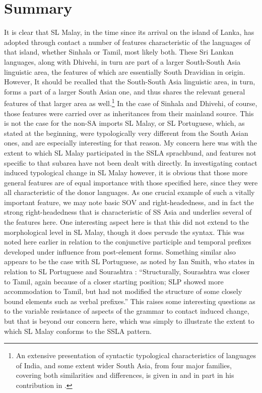 \section{Summary}
It is clear that SL Malay, in the time since its arrival on the island of Lanka, has adopted through contact a number of features characteristic of the languages of that island, whether Sinhala or Tamil, most likely both. These Sri Lankan languages, along with Dhivehi, in turn are part of a larger South-South Asia linguistic area, the features of which are essentially South Dravidian in origin. However, It should be recalled that the South-South Asia linguistic area, in turn, forms a part of a larger South Asian one, and thus shares the relevant general features of that larger area as well.\footnote{An
  extensive presentation of syntactic typological characteristics of languages of India, and some extent wider South Asia, from four major families, covering both similarities and differences, is given in \citet{Subbaraoinpress} and in part in his contribution in \citet{KachruEtAl2008}.
} 
In the case of Sinhala and Dhivehi, of course, those features were carried over as inheritances from their mainland source. This is not the case for the non-SA imports SL Malay, or SL Portuguese, which, as stated at the beginning, were typologically very different from the South Asian ones, and are especially interesting for that reason. My concern here was with the extent to which SL Malay participated in the SSLA sprachbund, and features not specific to that subarea have not been dealt with directly. In investigating contact induced typological change in SL Malay however, it is obvious that those more general features are of equal importance with those specified here, since they were all characteristic of the donor languages. 
 As one crucial example of such a vitally important feature, we may note basic SOV and right-headedness, and in fact the strong right-headedness that is characteristic of SS Asia and underlies several of the features here. One interesting aspect here is that this did not extend to the morphological level in SL Malay, though it does pervade the syntax. This was noted here earlier in relation to the conjunctive participle and temporal prefixes developed under influence from post-element forms. Something similar also appears to be the case with SL Portuguese, as noted by Ian Smith, who states in relation to SL Portuguese and Sourashtra \citep[408]{Smith2001}: ``Structurally, Sourashtra was closer to Tamil, again because of a closer starting position; SLP showed more accommodation to Tamil, but had not modified the structure of some closely bound elements such as verbal prefixes.'' This raises some interesting questions as to the variable resistance of aspects of the grammar to contact induced change, but that is beyond our concern here, which was simply to illustrate the extent to which SL Malay conforms to the SSLA pattern.
